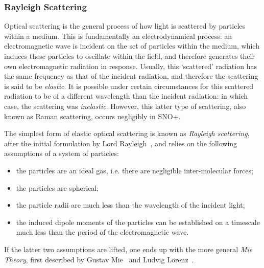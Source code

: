 \subsubsection{Rayleigh Scattering}
Optical scattering is the general process of how light is scattered by particles within a medium. This is fundamentally an electrodynamical process: an electromagnetic wave is incident on the set of particles within the medium, which induces these particles to oscillate within the field, and therefore generates their own electromagnetic radiation in response. Usually, this `scattered' radiation has the same frequency as that of the incident radiation, and therefore the scattering is said to be \textit{elastic}. It is possible under certain circumstances for this scattered radiation to be of a different wavelength than the incident radiation: in which case, the scattering was \textit{inelastic}. However, this latter type of scattering, also known as Raman scattering, occurs negligibly in SNO+.

The simplest form of elastic optical scattering is known as \textit{Rayleigh scattering}, after the initial formulation by Lord Rayleigh~\cite{rayleighTransmissionLightAtmosphere1899}, and relies on the following assumptions of a system of particles:
\begin{itemize}
    \item the particles are an ideal gas, i.e. there are negligible inter-molecular forces;
    \item the particles are spherical;
    \item the particle radii are much less than the wavelength of the incident light;
    \item the induced dipole moments of the particles can be established on a timescale much less than the period of the electromagnetic wave.
\end{itemize}
If the latter two assumptions are lifted, one ends up with the more general \textit{Mie Theory}, first described by Gustav Mie~\cite{mieContributionsOpticsTurbid1908} %
and Ludvig Lorenz~\cite{lorenzLumiereReflechieRefractee1898}. %

